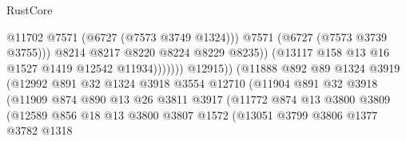 \begin{lexlean}{RustCore}
\begin{coremodule}
                                                      @11702
                                                      @7571
                                                      (@6727 (@7573 @3749 @1324)))
                                                    @7571
                                                    (@6727 (@7573 @3739 @3755)))
                                                  @8214
                                                  @8217
                                                  @8220
                                                  @8224
                                                  @8229
                                                  @8235))
                                              (@13117 @158 @13 @16 @1527 @1419 @12542 @11934)))))))
                                  @12915))
                              (@11888
                                @892
                                @89
                                @1324
                                @3919
                                (@12992
                                  @891
                                  @32
                                  @1324
                                  @3918
                                  @3554
                                  @12710
                                  (@11904
                                    @891
                                    @32
                                    @3918
                                    (@11909
                                      @874
                                      @890
                                      @13
                                      @26
                                      @3811
                                      @3917
                                      (@11772
                                        @874
                                        @13
                                        @3800
                                        @3809
                                        (@12589
                                          @856
                                          @18
                                          @13
                                          @3800
                                          @3807
                                          @1572
                                          (@13051
                                            @3799
                                            @3806
                                            @1377
                                            @3782
                                            @1318

\end{coremodule}
\end{lexlean}
